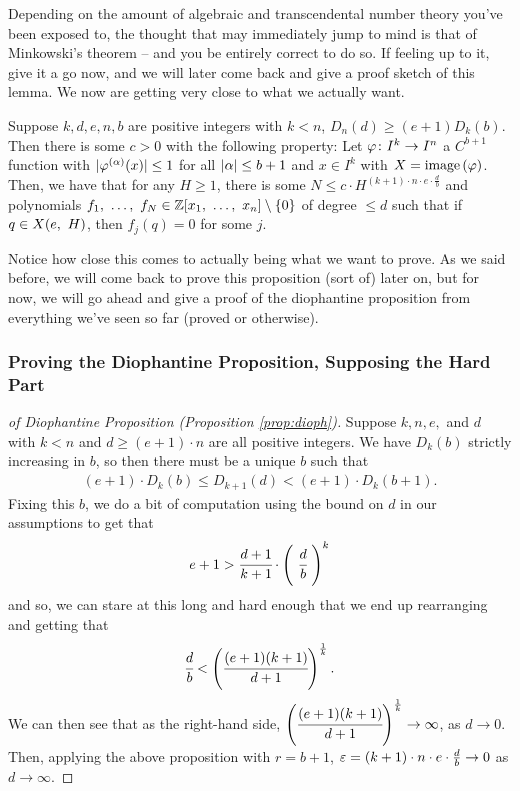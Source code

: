 Depending on the amount of algebraic and transcendental number theory you've been exposed to, the thought that may immediately jump to mind is that of Minkowski's theorem -- and you be entirely correct to do so. If feeling up to it, give it a go now, and we will later come back and give a proof sketch of this lemma. We now are getting very close to what we actually want.


\begin{proposition}
  Suppose $k, d, e, n, b$ are positive integers with $k < n$, $D_n(d) \geq (e + 1) D_k(b)$. Then there is some $c > 0$ with the following property: Let $\varphi \colon I^k \to I^n$ a $C^{b + 1}$ function with $\vert\varphi^{(\alpha)}(x)\vert \leq 1$ for all $\vert\alpha\vert \leq b + 1$ and $x \in I^{k}$ with $X = \operatorname{image}\left(\varphi\right)$. Then, we have that for any $H \geq 1$, there is some $N \leq c \cdot H^{(k+1) \cdot n \cdot e \cdot \frac{d}{b}}$ and polynomials $f_1, \ \hdots, \ f_{N} \in \mathbb{Z}[x_1, \ \hdots, \ x_{n}] \setminus \{ 0 \}$ of degree $\leq d$ such that if $q \in X(e, \ H)$, then $f_j(q) = 0$ for some $j$.
  \label{prop:pre_dioph}
\end{proposition}

Notice how close this comes to actually being what we want to prove. As we said before, we will come back to prove this proposition (sort of) later on, but for now, we will go ahead and give a proof of the diophantine proposition from everything we've seen so far (proved or otherwise).

\subsubsection{Proving the Diophantine Proposition, Supposing the Hard Part}

\begin{proof}[of Diophantine Proposition (Proposition \ref{prop:dioph})]
  Suppose $k, n, e, $ and $d$ with $k < n$ and $d \geq (e + 1) \cdot n$ are all positive integers. We have $D_k(b)$ strictly increasing in $b$, so then there must be a unique $b$ such that
    \begin{align*}
     (e + 1) \cdot D_k(b) \leq D_{k + 1}(d) < (e + 1) \cdot D_k(b + 1).
   \end{align*}
  Fixing this $b$, we do a bit of computation using the bound on $d$ in our assumptions to get that
    \begin{align*}
      e + 1 > \cfrac{d + 1}{k + 1} \cdot \left( \ \cfrac{d}{b} \ \right)^{k}
    \end{align*}
  and so, we can stare at this long and hard enough that we end up rearranging and getting that
    \begin{align*}
      \cfrac{d}{b} < \left( \cfrac{(e + 1)(k + 1)}{d + 1} \right)^{\frac{1}{k}}.
    \end{align*}
  We can then see that as the right-hand side, $\left( \cfrac{(e + 1)(k + 1)}{d + 1} \right)^{\frac{1}{k}} \to \infty$, as $d \to 0$. Then, applying the above proposition with $r = b+1$, $\varepsilon = (k+1) \cdot n \cdot e \cdot \frac{d}{b} \to 0$ as $d \to \infty$.
\end{proof}

